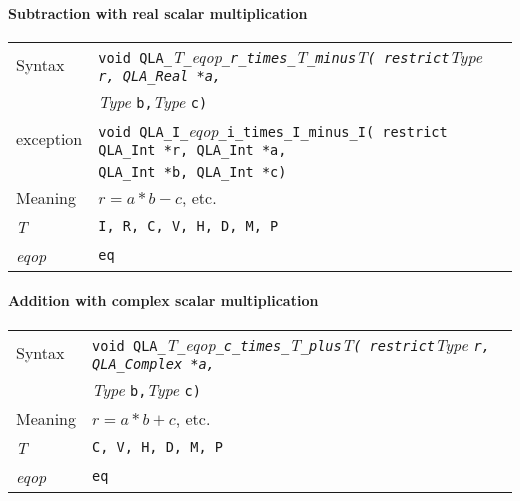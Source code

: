 \documentclass{article}
\newcommand{\tInt}{QLA\ttdash Int }
\newcommand{\tqlaReal}{QLA\ttdash Real }
\newcommand{\tqlaComplex}{QLA\ttdash Complex }
\newcommand{\tqlaInt}{QLA\ttdash Int }
\newcommand{\namespace}{QLA}
\newcommand{\allNumericTypes}{{\tt I, R, C, V, H, D, M, P}}
\newcommand{\ttdash}{{\tt \_}}
\newcommand{\itt}{\it T}
\newcommand{\extraarg}{}
\begin{document}
\paragraph{Subtraction with real scalar multiplication}

\begin{flushleft}
  \begin{tabular}{|l|l|}
  \hline
  Syntax      & {{\tt void \namespace}\ttdash\itt\ttdash{\it eqop}\ttdash{\tt r}\ttdash{\tt times}\ttdash\itt\ttdash{\tt minus}\itt{\tt ( restrict}{\it Type }{\tt *r, \tqlaReal *a,}}\\
              & {{\it Type }{\tt *b,}{\it Type }{\tt *c\extraarg)}} \\
  exception   & {\tt void \namespace}\ttdash{\tt I}\ttdash{\it eqop}\ttdash{\tt i}\ttdash{\tt times}\ttdash{\tt I}\ttdash{\tt minus}\ttdash{\tt I( restrict \tInt *r, \tqlaInt *a,}\\
              & {\tt \tInt *b, \tInt *c\extraarg)} \\
  \hline
  Meaning     & $r = a * b - c$, etc. \\
  \hline
  \itt        & \allNumericTypes \\
  \hline
  {\it eqop}  & {\tt eq} \\
  \hline
  \end{tabular}
\end{flushleft}

\paragraph{Addition with complex scalar multiplication}

\begin{flushleft}
  \begin{tabular}{|l|l|}
  \hline
  Syntax      & {\tt void \namespace}\ttdash\itt\ttdash{\it eqop}\ttdash{\tt c}\ttdash{\tt times}\ttdash\itt\ttdash{\tt plus}\itt{\tt ( restrict}{\it Type }{\tt *r, }{\tt \tqlaComplex *a, }\\
              & {\it Type }{\tt *b,}{\it Type }{\tt *c\extraarg)} \\
  \hline
  Meaning     & $r = a * b + c$, etc. \\
  \hline
  \itt        & {\tt C, V, H, D, M, P} \\
  \hline
  {\it eqop}  & {\tt eq} \\
  \hline
  \end{tabular}
\end{flushleft}
\end{document}
